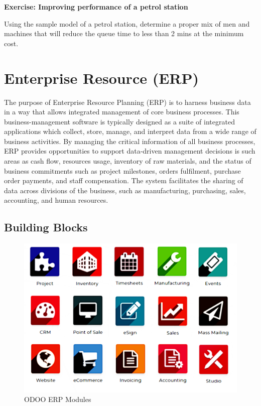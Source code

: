 \documentclass[]{book}
\let\BeginKnitrBlock\begin \let\EndKnitrBlock\end
\begin{document}
\BeginKnitrBlock{rmdexercise}
\textbf{Exercise: Improving performance of a petrol station}

Using the sample model of a petrol station, determine a proper mix of men and machines that will reduce the queue time to less than 2 mins at the minimum cost.
\EndKnitrBlock{rmdexercise}

\hypertarget{enterprise-resource-erp}{%
\section{Enterprise Resource (ERP)}\label{enterprise-resource-erp}}

The purpose of Enterprise Resource Planning (ERP) is to harness business data in a way that allows integrated management of core business processes. This business-management software is typically designed as a suite of integrated applications which collect, store, manage, and interpret data from a wide range of business activities. By managing the critical information of all business processes, ERP provides opportunities to support data-driven management decisions is such areas as cash flow, resources usage, inventory of raw materials, and the status of business commitments such as project milestones, orders fulfilment, purchase order payments, and staff compensation. The system facilitates the sharing of data across divisions of the business, such as manufacturing, purchasing, sales, accounting, and human resources.

\hypertarget{building-blocks}{%
\subsection{Building Blocks}\label{building-blocks}}

\begin{figure}
\centering
\includegraphics{images/odooerp.png}
\caption{ODOO ERP Modules}
\end{figure}
\end{document}
